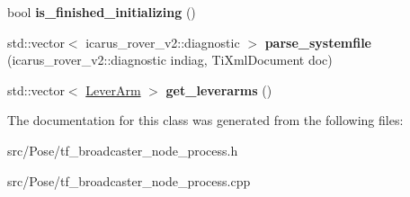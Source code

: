 \begin{DoxyCompactItemize}
bool {\bfseries is\+\_\+finished\+\_\+initializing} ()
\item 
\mbox{\label{classTfBroadcasterNodeProcess_af99b206effdf77dbef628bf8a6388bf2}} 
std\+::vector$<$ icarus\+\_\+rover\+\_\+v2\+::diagnostic $>$ {\bfseries parse\+\_\+systemfile} (icarus\+\_\+rover\+\_\+v2\+::diagnostic indiag, Ti\+Xml\+Document doc)
\item 
\mbox{\label{classTfBroadcasterNodeProcess_a23d97b3bb3303dd0a613a916194b3f4d}} 
std\+::vector$<$ \hyperlink{structLeverArm}{Lever\+Arm} $>$ {\bfseries get\+\_\+leverarms} ()
\end{DoxyCompactItemize}


The documentation for this class was generated from the following files\+:\begin{DoxyCompactItemize}
\item 
src/\+Pose/tf\+\_\+broadcaster\+\_\+node\+\_\+process.\+h\item 
src/\+Pose/tf\+\_\+broadcaster\+\_\+node\+\_\+process.\+cpp\end{DoxyCompactItemize}
